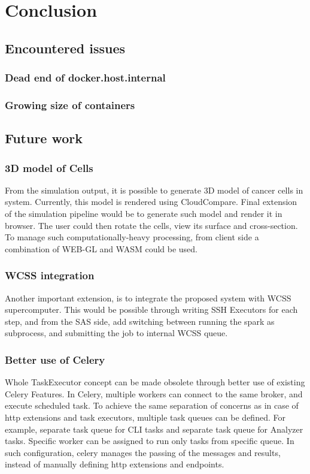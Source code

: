 \chapter{Conclusion}
\label{chapter:6}
\section{Encountered issues}
\subsection{Dead end of docker.host.internal}
\subsection{Growing size of containers}
\section{Future work}
\subsection{3D model of Cells}
From the simulation output, it is possible to generate 3D model of cancer cells in system. Currently, this model is rendered using CloudCompare. Final extension of the simulation pipeline would be to generate such model and render it in browser. The user could then rotate the cells, view its surface and cross-section. To manage such computationally-heavy processing, from client side a combination of WEB-GL and WASM could be used.
\subsection{WCSS integration}
Another important extension, is to integrate the proposed system with WCSS supercomputer. This would be possible through writing SSH Executors for each step, and from the SAS side, add switching between running the spark as subprocess, and submitting the job to internal WCSS queue.
\subsection{Better use of Celery}
Whole TaskExecutor concept can be made obsolete through better use of existing Celery Features. In Celery, multiple workers can connect to the same broker, and execute scheduled task. To achieve the same separation of concerns as in case of http extensions and task executors, multiple task queues can be defined. For example, separate task queue for CLI tasks and separate task queue for Analyzer tasks. Specific worker can be assigned to run only tasks from specific queue. In such configuration, celery manages the passing of the messages and results, instead of manually defining http extensions and endpoints.
